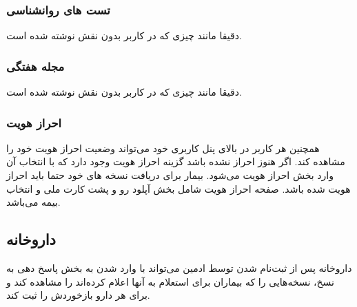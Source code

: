 \documentclass[a4paper]{article}
\begin{document}
		\subsubsection{تست های روانشناسی}
		دقیقا مانند چیزی که در کاربر بدون نقش نوشته شده است.
		\subsubsection{مجله هفتگی}
		دقیقا مانند چیزی که در کاربر بدون نقش نوشته شده است.

		\subsubsection{احراز هویت}
همچنین هر کاربر در بالای پنل کاربری خود می‌تواند وضعیت احراز هویت خود را مشاهده کند. اگر هنوز احراز نشده باشد گزینه احراز هویت وجود دارد که با انتخاب آن وارد بخش احراز هویت می‌شود.
بیمار برای دریافت نسخه های خود حتما باید احراز هویت شده باشد. صفحه احراز هویت شامل بخش آپلود رو و پشت کارت ملی و انتخاب بیمه می‌باشد.

	\subsection{داروخانه}
		داروخانه پس از ثبت‌نام شدن توسط ادمین می‌تواند با وارد شدن به بخش پاسخ دهی به نسخ، نسخه‌هایی را که بیماران برای استعلام به آنها اعلام کرده‌اند را مشاهده کند و برای هر دارو بازخوردش را ثبت کند.
\end{document}
